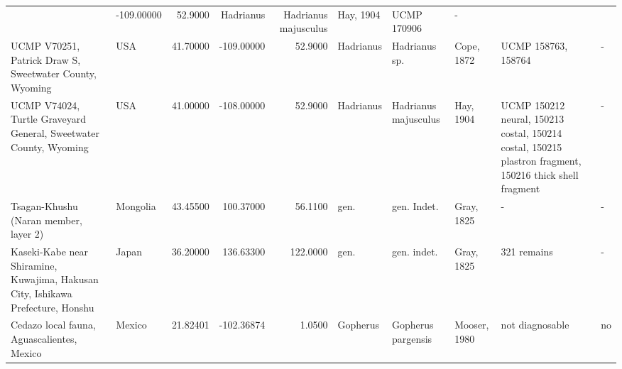 \begin{landscape}
{\begin{longtable}[]{@{}llrrrlllll@{}}
& -109.00000 & 52.9000 & Hadrianus & Hadrianus majusculus & Hay, 1904 &
UCMP 170906 & -\tabularnewline
UCMP V70251, Patrick Draw S, Sweetwater County, Wyoming & USA & 41.70000
& -109.00000 & 52.9000 & Hadrianus & Hadrianus sp. & Cope, 1872 & UCMP
158763, 158764 & -\tabularnewline
UCMP V74024, Turtle Graveyard General, Sweetwater County, Wyoming & USA
& 41.00000 & -108.00000 & 52.9000 & Hadrianus & Hadrianus majusculus &
Hay, 1904 & UCMP 150212 neural, 150213 costal, 150214 costal, 150215
plastron fragment, 150216 thick shell fragment & -\tabularnewline
Tsagan-Khushu (Naran member, layer 2) & Mongolia & 43.45500 & 100.37000
& 56.1100 & gen. & gen. Indet. & Gray, 1825 & - & -\tabularnewline
Kaseki-Kabe near Shiramine, Kuwajima, Hakusan City, Ishikawa Prefecture,
Honshu & Japan & 36.20000 & 136.63300 & 122.0000 & gen. & gen. indet. &
Gray, 1825 & 321 remains & -\tabularnewline
Cedazo local fauna, Aguascalientes, Mexico & Mexico & 21.82401 &
-102.36874 & 1.0500 & Gopherus & Gopherus pargensis & Mooser, 1980 & not
diagnosable & no\tabularnewline
\bottomrule
\end{longtable}
}


\end{landscape}